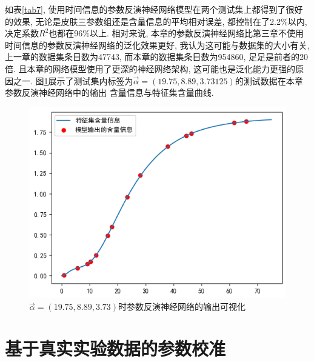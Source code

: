 \documentclass[a4paper,punct=banjiao,twoside]{ctexrep}
\theoremstyle{plain}
\theoremstyle{definition}
\theoremstyle{remark}
\begin{document}
如表\ref{tab7}, 使用时间信息的参数反演神经网络模型在两个测试集上都得到了很好的效果, 无论是皮肤三参数组还是含量信息的平均相对误差, 都控制在了2.2\%以内, 决定系数$R^2$也都在96\%以上. 相对来说, 本章的参数反演神经网络比第三章不使用时间信息的参数反演神经网络的泛化效果更好, 我认为这可能与数据集的大小有关, 上一章的数据集条目数为47743, 而本章的数据集条目数为954860, 足足是前者的20倍. 且本章的网络模型使用了更深的神经网络架构, 这可能也是泛化能力更强的原因之一.
图\ref{时间网络反演}展示了测试集内标签为$\vec{\alpha}=(19.75,8.89,3.73125)$的测试数据在本章参数反演神经网络中的输出
含量信息与特征集含量曲线.
\begin{figure}[H]
  \centering
  \includegraphics[scale=0.5]{./figs/p7.png}
  \caption{$\vec{\alpha}=(19.75,8.89,3.73)$时参数反演神经网络的输出可视化}
  \label{时间网络反演}
\end{figure}

\section{基于真实实验数据\cite{11}的参数校准}
\end{document}
